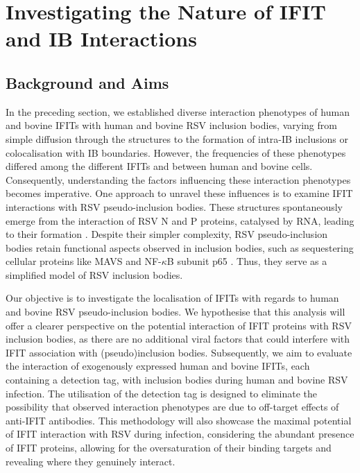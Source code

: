 \chapter{Investigating the Nature of IFIT and IB Interactions} \label{ch:Investigating the Nature of IFIT and IB Interactions}
\section{Background and Aims} \label{sec:Background and Aims-Chapter4}
In the preceding section, we established diverse interaction phenotypes of human and bovine IFITs with human and bovine RSV inclusion bodies, varying from simple diffusion through the structures to the formation of intra-IB inclusions or colocalisation with IB boundaries. However, the frequencies of these phenotypes differed among the different IFITs and between human and bovine cells. Consequently, understanding the factors influencing these interaction phenotypes becomes imperative. One approach to unravel these influences is to examine IFIT interactions with RSV pseudo-inclusion bodies. These structures spontaneously emerge from the interaction of RSV N and P proteins, catalysed by RNA, leading to their formation \cite{Rincheval2017FunctionalVirus, Galloux2020MinimalVitro}. Despite their simpler complexity, RSV pseudo-inclusion bodies retain functional aspects observed in inclusion bodies, such as sequestering cellular proteins like MAVS and NF-\(\kappa\)B subunit p65 \cite{Rincheval2017FunctionalVirus, Jobe2023ViralCondensates}. Thus, they serve as a simplified model of RSV inclusion bodies.

Our objective is to investigate the localisation of IFITs with regards to human and bovine RSV pseudo-inclusion bodies. We hypothesise that this analysis will offer a clearer perspective on the potential interaction of IFIT proteins with RSV inclusion bodies, as there are no additional viral factors that could interfere with IFIT association with (pseudo)inclusion bodies. Subsequently, we aim to evaluate the interaction of exogenously expressed human and bovine IFITs, each containing a detection tag, with inclusion bodies during human and bovine RSV infection. The utilisation of the detection tag is designed to eliminate the possibility that observed interaction phenotypes are due to off-target effects of anti-IFIT antibodies. This methodology will also showcase the maximal potential of IFIT interaction with RSV during infection, considering the abundant presence of IFIT proteins, allowing for the oversaturation of their binding targets and revealing where they genuinely interact.

